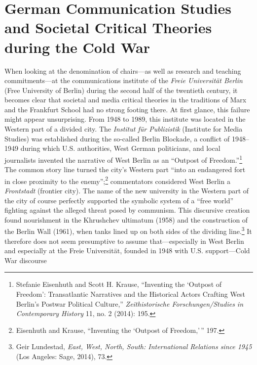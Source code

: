 \documentclass{tufte-handout}
\begin{document}
\hypertarget{german-communication-studies-and-societal-critical-theories-during-the-cold-war}{%
\section{German Communication Studies and Societal Critical Theories
\\\noindent during the Cold
War}}\label{german-communication-studies-and-societal-critical-theories-during-the-cold-war}

\enlargethispage{1\baselineskip}

When looking at the denomination of chairs---as well as research and
teaching commitments---at the communications institute of the
\emph{Freie Universität Berlin} (Free University of Berlin) during the
second half of the twentieth century, it becomes clear that societal and
media critical theories in the traditions of Marx and the Frankfurt
School had no strong footing there. At first glance, this failure might
appear unsurprising. From 1948 to 1989, this institute was located in
the Western part of a divided city. The \emph{Institut für Publizistik}
(Institute for Media Studies) was established during the so-called
Berlin Blockade, a conflict of 1948--1949 during which U.S. authorities,
West German politicians, and local journalists invented the narrative of
West Berlin as an ``Outpost of Freedom.''\footnote{Stefanie Eisenhuth
  and Scott H. Krause, ``Inventing the `Outpost of Freedom':
  Transatlantic Narratives and the Historical Actors Crafting West
  Berlin's Postwar Political Culture,'' \emph{Zeithistorische
  Forschungen/Studies in Contemporary History} 11, no. 2 (2014): 195.}
The common story line turned the city's Western part ``into an
endangered fort in close proximity to the enemy'';\footnote{Eisenhuth
  and Krause, ``Inventing the `Outpost of Freedom,'\,'' 197.}
commentators considered West Berlin a \emph{Frontstadt} (frontier city).
The name of the new university in the Western part of the city of course
perfectly supported the symbolic system of a ``free world'' fighting
against the alleged threat posed by communism. This discursive creation
found nourishment in the Khrushchev ultimatum (1958) and the
construction of the Berlin Wall (1961), when tanks lined up on both
sides of the dividing line.\footnote{Geir Lundestad, \emph{East, West,
  North, South: International Relations since 1945} (Los Angeles: Sage,
  2014), 73.} It therefore does not seem presumptive to assume
that---especially in West Berlin and especially at the Freie
Universität, founded in 1948 with U.S. support---Cold War discourse
\end{document}
